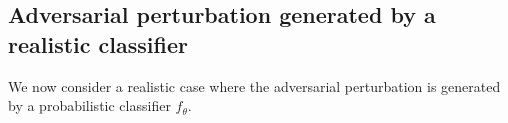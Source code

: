 \subsection{Adversarial perturbation generated by a realistic classifier}
\label{sect:reason-realistic}
We now consider a realistic case where the adversarial perturbation is generated by a probabilistic classifier $f_\theta$. 


